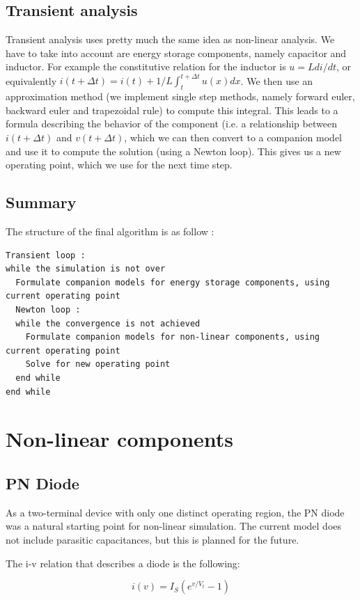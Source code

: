\documentclass{article}
\begin{document}
\subsection{Transient analysis}
Transient analysis uses pretty much the same idea as non-linear analysis. We have to take into account are energy storage components, namely capacitor and inductor. For example the constitutive relation for the inductor is $u = L di/dt$, or equivalently $i(t+\Delta t) = i(t) + 1/L \int_t^{t+\Delta t} u(x) dx$. We then use an approximation method (we implement single step methods, namely forward euler, backward euler and trapezoidal rule) to compute this integral. This leads to a formula describing the behavior of the component (i.e. a relationship between $i(t+\Delta t)$ and $v(t+\Delta t)$, which we can then convert to a companion model and use it to compute the solution (using a Newton loop). This gives us a new operating point, which we use for the next time step.
\subsection{Summary}
The structure of the final algorithm is as follow :
\begin{lstlisting}
Transient loop :
while the simulation is not over
  Formulate companion models for energy storage components, using current operating point
  Newton loop :
  while the convergence is not achieved
    Formulate companion models for non-linear components, using current operating point
    Solve for new operating point
  end while
end while
\end{lstlisting}
\section{Non-linear components}
\subsection{PN Diode}

As a two-terminal device with only one distinct operating region, the PN diode was a natural starting point for non-linear simulation.  The current model does not include parasitic capacitances, but this is planned for the future.

The i-v relation that describes a diode is the following:

\begin{equation}
i(v) = I_S(e^{v/V_t}-1)
\end{equation}
\end{document}
